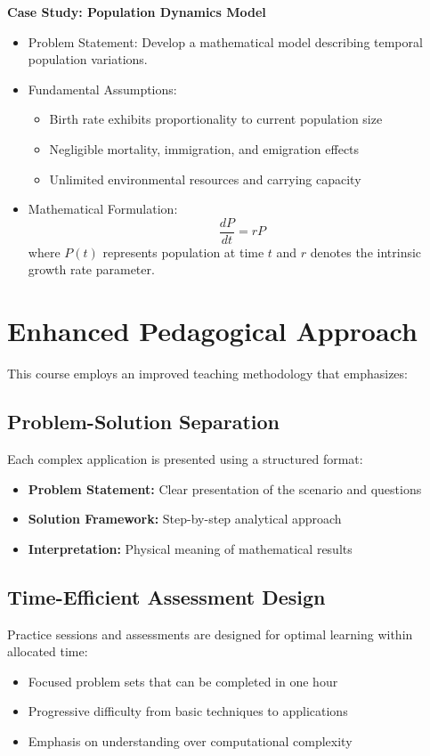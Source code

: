\documentclass[12pt, letterpaper]{book}
\theoremstyle{problemstyle}
\theoremstyle{solutionstyle}
\begin{document}
\textbf{Case Study: Population Dynamics Model}
\begin{itemize}
    \item Problem Statement: Develop a mathematical model describing temporal population variations.
    \item Fundamental Assumptions:
    \begin{itemize}
        \item Birth rate exhibits proportionality to current population size
        \item Negligible mortality, immigration, and emigration effects
        \item Unlimited environmental resources and carrying capacity
    \end{itemize}
    \item Mathematical Formulation:
    \begin{equation*}
        \frac{dP}{dt} = rP
    \end{equation*}
    where $P(t)$ represents population at time $t$ and $r$ denotes the intrinsic growth rate parameter.
\end{itemize}

\section{Enhanced Pedagogical Approach}
This course employs an improved teaching methodology that emphasizes:

\subsection{Problem-Solution Separation}
Each complex application is presented using a structured format:
\begin{itemize}
    \item \textbf{Problem Statement:} Clear presentation of the scenario and questions
    \item \textbf{Solution Framework:} Step-by-step analytical approach
    \item \textbf{Interpretation:} Physical meaning of mathematical results
\end{itemize}

\subsection{Time-Efficient Assessment Design}
Practice sessions and assessments are designed for optimal learning within allocated time:
\begin{itemize}
    \item Focused problem sets that can be completed in one hour
    \item Progressive difficulty from basic techniques to applications
    \item Emphasis on understanding over computational complexity
\end{itemize}
\end{document}
